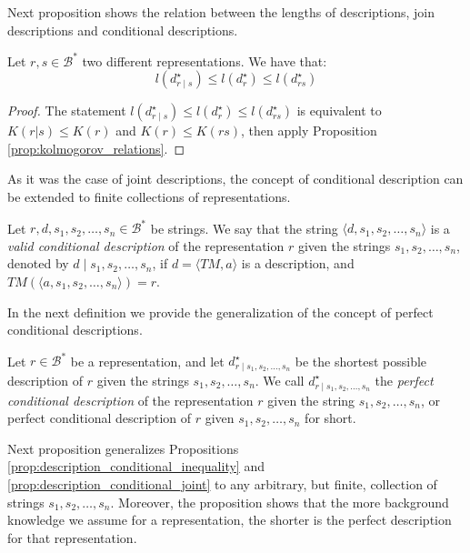 Next proposition shows the relation between the lengths of descriptions, join descriptions and conditional descriptions.

\begin{proposition}
\label{prop:description_conditional_joint}
Let $r, s \in \mathcal{B}^\ast$ two different representations. We have that:
\[
l \left( d^\star_{r \mid s} \right) \leq l \left( d^\star_r \right) \leq l \left( d^\star_{rs} \right)
\]
\end{proposition}
\begin{proof}
The statement $l \left( d^\star_{r \mid s} \right) \leq l \left( d^\star_r \right) \leq l \left( d^\star_{rs} \right)$ is equivalent to $K(r | s ) \leq K(r)$ and $K(r) \leq K(rs)$, then apply Proposition \ref{prop:kolmogorov_relations}.
\end{proof}

As it was the case of joint descriptions, the concept of conditional description can be extended to finite collections of representations.

\begin{definition}
Let $r, d, s_1, s_2, \ldots, s_n \in \mathcal{B}^\ast$ be strings. We say that the string $\langle d, s_1, s_2, \ldots, s_n \rangle$ is a \emph{valid conditional description} of the representation $r$ given the strings $s_1, s_2, \ldots, s_n$, denoted by $d \mid s_1, s_2, \ldots, s_n$, if $d = \langle TM, a \rangle$ is a description, and $TM \left(\langle a, s_1, s_2, \ldots, s_n \rangle \right) = r$.
\end{definition}

In the next definition we provide the generalization of the concept of perfect conditional descriptions.

\begin{definition}
Let $r \in \mathcal{B}^\ast$ be a representation, and let $d^\star_{r \mid s_1, s_2, \ldots, s_n}$ be the shortest possible description of $r$ given the strings $s_1, s_2, \ldots, s_n$. We call $d^\star_{r \mid s_1, s_2, \ldots, s_n}$ the \emph{perfect conditional description} of the representation $r$ given the string $s_1, s_2, \ldots, s_n$, or perfect conditional description of $r$ given $s_1, s_2, \ldots, s_n$ for short.
\end{definition}

Next proposition generalizes Propositions \ref{prop:description_conditional_inequality} and \ref{prop:description_conditional_joint} to any arbitrary, but finite, collection of strings $s_1, s_2, \ldots, s_n$. Moreover, the proposition shows that the more background knowledge we assume for a representation, the shorter is the perfect description for that representation.

